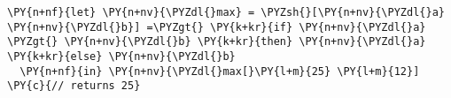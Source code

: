 \begin{Verbatim}[commandchars=\\\{\}]
\PY{n+nf}{let} \PY{n+nv}{\PYZdl{}max} = \PYZsh{}[\PY{n+nv}{\PYZdl{}a} \PY{n+nv}{\PYZdl{}b}] =\PYZgt{} \PY{k+kr}{if} \PY{n+nv}{\PYZdl{}a} \PYZgt{} \PY{n+nv}{\PYZdl{}b} \PY{k+kr}{then} \PY{n+nv}{\PYZdl{}a} \PY{k+kr}{else} \PY{n+nv}{\PYZdl{}b}
  \PY{n+nf}{in} \PY{n+nv}{\PYZdl{}max[}\PY{l+m}{25} \PY{l+m}{12}] \PY{c}{// returns 25}
\end{Verbatim}
